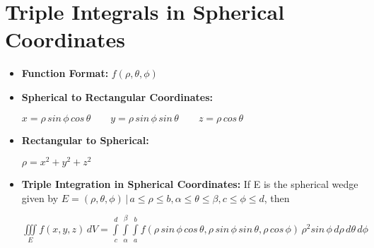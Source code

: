 \documentclass{report}
\begin{document}
	\section{Triple Integrals in Spherical Coordinates}
		\begin{itemize}\addtolength{\leftskip}{2em}
			\item \textbf{Function Format:} $f(\rho,\theta,\phi)$
			\item \textbf{Spherical to Rectangular Coordinates:}
			\begin{center}
			$x=\rho\,sin\,\phi\,cos\,\theta\quad\quad y=\rho\,sin\,\phi\,sin\,\theta\quad\quad z=\rho\,cos\,\theta$
			\end{center}
			\item\textbf{Rectangular to Spherical:}
			\begin{center}
			$\rho = x^2+y^2+z^2$
			\end{center}
			\item\textbf{Triple Integration in Spherical Coordinates:} \newline If E is the spherical wedge given by $E={(\rho,\theta,\phi)\,|\, a \le \rho \le b,\alpha \le \theta \le \beta, c \le \phi \le d}$, then
			\begin{center}
			\Large$\iiint\limits_{E}f(x,y,z)\,dV=\int\limits_{c}^{d}\int\limits_{\alpha}^{\beta}\int\limits_{a}^{b}f(\rho\,sin\,\phi\,cos\,\theta,\rho\,sin\,\phi\,sin\,\theta,\rho\,cos\,\phi)\,\rho^2sin\,\phi\,d\rho\,d\theta\,d\phi$
			\end{center}
		\end{itemize}
\end{document}
